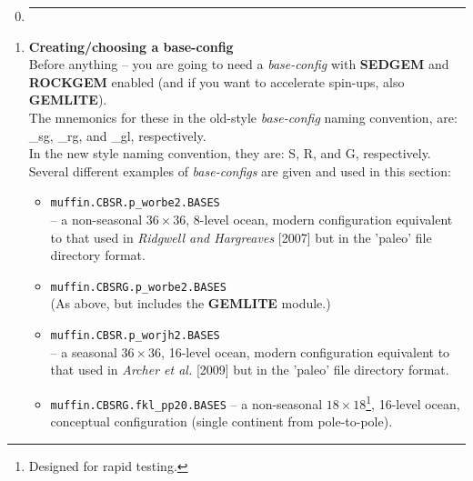 \vspace{1mm}
\begin{enumerate}[noitemsep]
\setcounter{enumi}{-1}

\item []\noindent\rule{4cm}{0.5pt}
\vspace{1mm}

\vspace{1mm}
\item \textbf{Creating/choosing a base-config}
\vspace{1mm}
\\Before anything -- you are going to need a \textit{base-config} with \textbf{SEDGEM} and \textbf{ROCKGEM} enabled (and if you want to accelerate spin-ups, also \textbf{GEMLITE}). 
\\The mnemonics for these in the old-style \textit{base-config} naming convention, are: \textsf{\footnotesize \_sg}, \textsf{\footnotesize \_rg}, and \textsf{\footnotesize \_gl}, respectively.
\\In the new style naming convention, they are: \textsf{\footnotesize S}, \textsf{\footnotesize R}, and \textsf{\footnotesize G}, respectively.
\vspace{1mm}
\\Several different examples of\textit{ base-configs} are given and used in this section:
\begin{itemize}[noitemsep]
\vspace{1mm}
\item \texttt{muffin.CBSR.p\_worbe2.BASES}
\\-- a non-seasonal \(36\times36\), 8-level ocean, modern configuration equivalent to that used in \textit{Ridgwell and Hargreaves} [2007] but in the 'paleo' file directory format.
\vspace{1mm}
\item \texttt{muffin.CBSRG.p\_worbe2.BASES}
\\(As above, but includes the \textbf{GEMLITE} module.)
\vspace{1mm}
\item \texttt{muffin.CBSR.p\_worjh2.BASES}
\\-- a seasonal \(36\times36\), 16-level ocean, modern configuration  equivalent to that used in \textit{Archer et al.} [2009] but in the 'paleo' file directory format.
\vspace{1mm}
\item \texttt{muffin.CBSRG.fkl\_pp20.BASES}
-- a  non-seasonal \(18\times18\)\footnote{Designed for rapid testing.}, 16-level ocean, conceptual configuration (single continent from pole-to-pole).

\end{itemize}
\end{enumerate}
